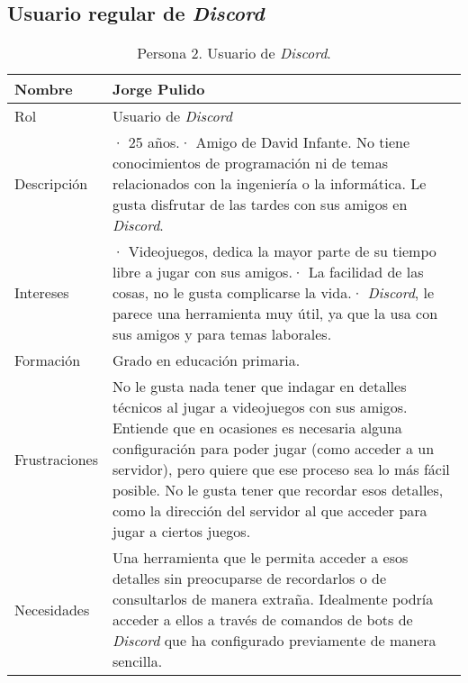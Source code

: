 \subsection{Usuario regular de \textit{Discord}}
\label{sec:personaUsuarioDiscord}
\begin{table}[H]
    \centering
    \def\arraystretch{1.25}
    \begin{adjustbox}{max width=\textwidth}
    \begin{tabularx}{\textwidth}{|l|L|}
    \hline
        \textbf{Nombre} & \textbf{Jorge Pulido} \\ \hline
    \hline
        Rol & Usuario de \textit{Discord} \\ \hline
        Descripción & · 25 años.\linebreak · Amigo de David Infante. No tiene conocimientos de programación ni de temas relacionados con la ingeniería o la informática. Le gusta disfrutar de las tardes con sus amigos en \textit{Discord}. \\ \hline
        Intereses & · Videojuegos, dedica la mayor parte de su tiempo libre a jugar con sus amigos.\linebreak · La facilidad de las cosas, no le gusta complicarse la vida.\linebreak · \textit{Discord}, le parece una herramienta muy útil, ya que la usa con sus amigos y para temas laborales. \\ \hline
        Formación & Grado en educación primaria. \\ \hline
        Frustraciones & No le gusta nada tener que indagar en detalles técnicos al jugar a videojuegos con sus amigos. Entiende que en ocasiones es necesaria alguna configuración para poder jugar (como acceder a un servidor), pero quiere que ese proceso sea lo más fácil posible. No le gusta tener que recordar esos detalles, como la dirección del servidor al que acceder para jugar a ciertos juegos. \\ \hline
        Necesidades & Una herramienta que le permita acceder a esos detalles sin preocuparse de recordarlos o de consultarlos de manera extraña. Idealmente podría acceder a ellos a través de comandos de bots de \textit{Discord} que ha configurado previamente de manera sencilla. \\ \hline
    \end{tabularx}
    \end{adjustbox}
    \caption{Persona 2. Usuario de \textit{Discord}.}
\end{table}

